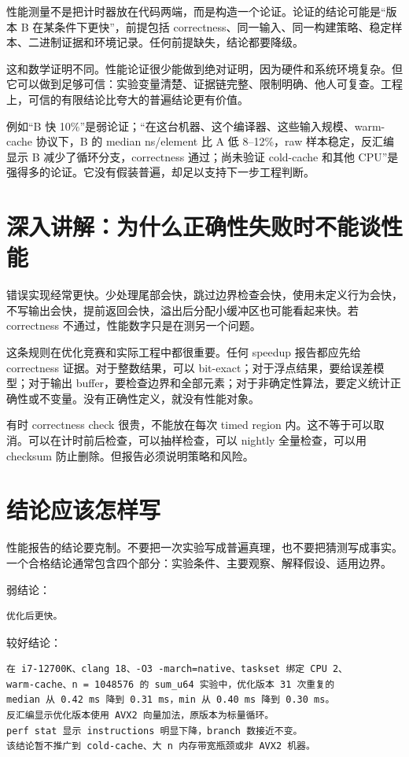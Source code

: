 性能测量不是把计时器放在代码两端，而是构造一个论证。论证的结论可能是“版本 B 在某条件下更快”，前提包括 correctness、同一输入、同一构建策略、稳定样本、二进制证据和环境记录。任何前提缺失，结论都要降级。

这和数学证明不同。性能论证很少能做到绝对证明，因为硬件和系统环境复杂。但它可以做到足够可信：实验变量清楚、证据链完整、限制明确、他人可复查。工程上，可信的有限结论比夸大的普遍结论更有价值。

例如“B 快 10\%”是弱论证；“在这台机器、这个编译器、这些输入规模、warm-cache 协议下，B 的 median ns/element 比 A 低 8–12\%，raw 样本稳定，反汇编显示 B 减少了循环分支，correctness 通过；尚未验证 cold-cache 和其他 CPU”是强得多的论证。它没有假装普遍，却足以支持下一步工程判断。

\section{深入讲解：为什么正确性失败时不能谈性能}

错误实现经常更快。少处理尾部会快，跳过边界检查会快，使用未定义行为会快，不写输出会快，提前返回会快，溢出后分配小缓冲区也可能看起来快。若 correctness 不通过，性能数字只是在测另一个问题。

这条规则在优化竞赛和实际工程中都很重要。任何 speedup 报告都应先给 correctness 证据。对于整数结果，可以 bit-exact；对于浮点结果，要给误差模型；对于输出 buffer，要检查边界和全部元素；对于非确定性算法，要定义统计正确性或不变量。没有正确性定义，就没有性能对象。

有时 correctness check 很贵，不能放在每次 timed region 内。这不等于可以取消。可以在计时前后检查，可以抽样检查，可以 nightly 全量检查，可以用 checksum 防止删除。但报告必须说明策略和风险。

\section{结论应该怎样写}

性能报告的结论要克制。不要把一次实验写成普遍真理，也不要把猜测写成事实。一个合格结论通常包含四个部分：实验条件、主要观察、解释假设、适用边界。

弱结论：

\begin{lstlisting}
优化后更快。
\end{lstlisting}

较好结论：

\begin{lstlisting}
在 i7-12700K、clang 18、-O3 -march=native、taskset 绑定 CPU 2、
warm-cache、n = 1048576 的 sum_u64 实验中，优化版本 31 次重复的
median 从 0.42 ms 降到 0.31 ms，min 从 0.40 ms 降到 0.30 ms。
反汇编显示优化版本使用 AVX2 向量加法，原版本为标量循环。
perf stat 显示 instructions 明显下降，branch 数接近不变。
该结论暂不推广到 cold-cache、大 n 内存带宽瓶颈或非 AVX2 机器。
\end{lstlisting}

